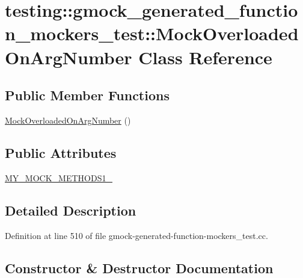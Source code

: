 \hypertarget{classtesting_1_1gmock__generated__function__mockers__test_1_1_mock_overloaded_on_arg_number}{}\section{testing\+:\+:gmock\+\_\+generated\+\_\+function\+\_\+mockers\+\_\+test\+:\+:Mock\+Overloaded\+On\+Arg\+Number Class Reference}
\label{classtesting_1_1gmock__generated__function__mockers__test_1_1_mock_overloaded_on_arg_number}
\subsection*{Public Member Functions}
\begin{DoxyCompactItemize}
\item 
\hyperlink{classtesting_1_1gmock__generated__function__mockers__test_1_1_mock_overloaded_on_arg_number_ad5b40981c39bc0bec3b63632cf827153}{Mock\+Overloaded\+On\+Arg\+Number} ()
\end{DoxyCompactItemize}
\subsection*{Public Attributes}
\begin{DoxyCompactItemize}
\item 
\hyperlink{classtesting_1_1gmock__generated__function__mockers__test_1_1_mock_overloaded_on_arg_number_a5076ebd17fb1cc93952b4a80fe6de894}{M\+Y\+\_\+\+M\+O\+C\+K\+\_\+\+M\+E\+T\+H\+O\+D\+S1\+\_\+}
\end{DoxyCompactItemize}


\subsection{Detailed Description}


Definition at line 510 of file gmock-\/generated-\/function-\/mockers\+\_\+test.\+cc.



\subsection{Constructor \& Destructor Documentation}
